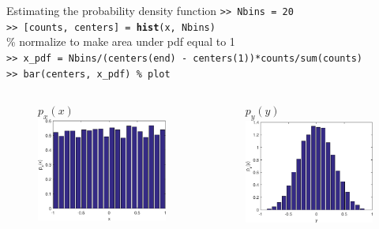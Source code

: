 \documentclass[10pt, handout]{beamer}
\begin{document}
\begin{frame}{Estimating the probability density function}
\texttt{>> Nbins = 20} \\
\texttt{>> [counts, centers] = \textbf{hist}(x, Nbins)} \\
{\color{matlabcomment}\% normalize to make area under pdf equal to 1} \\
\texttt{>> x\_pdf = Nbins/(centers(end) - centers(1))*counts/sum(counts)} \\
\texttt{>> bar(centers, x\_pdf) {\color{matlabcomment}\% plot}}
\begin{columns}
	\begin{column}{0.5\textwidth}
			\begin{figure}
				\centering
				$p_x(x)$
				\includegraphics[width=\linewidth]{figs/lec2_random_experiment1_hist_x.eps}
			\end{figure}		
	\end{column}
	\begin{column}{0.5\textwidth}
	\begin{figure}
		\centering
		$p_y(y)$
		\includegraphics[width=\linewidth]{figs/lec2_random_experiment1_hist_y.eps}

\end{figure}
\end{column}
\end{columns}
\end{frame}
\end{document}
